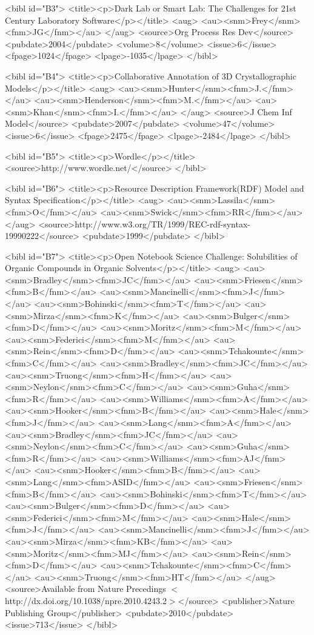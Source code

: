 \documentclass[10pt]{bmc_article}
\newenvironment{bmcformat}{\begin{raggedright}\baselineskip20pt\sloppy\setboolean{publ}{false}}{\end{raggedright}\baselineskip20pt\sloppy}
\begin{document}
\begin{bmcformat}
{<bibl id="B3">
  <title><p>Dark Lab or Smart Lab: The Challenges for 21st Century Laboratory
  Software</p></title>
  <aug>
    <au><snm>Frey</snm><fnm>JG</fnm></au>
  </aug>
  <source>Org Process Res Dev</source>
  <pubdate>2004</pubdate>
  <volume>8</volume>
  <issue>6</issue>
  <fpage>1024</fpage>
  <lpage>-1035</lpage>
</bibl>

<bibl id="B4">
  <title><p>Collaborative Annotation of {3D} Crystallographic
  Models</p></title>
  <aug>
    <au><snm>Hunter</snm><fnm>J.</fnm></au>
    <au><snm>Henderson</snm><fnm>M.</fnm></au>
    <au><snm>Khan</snm><fnm>I.</fnm></au>
  </aug>
  <source>J Chem Inf Model</source>
  <pubdate>2007</pubdate>
  <volume>47</volume>
  <issue>6</issue>
  <fpage>2475</fpage>
  <lpage>-2484</lpage>
</bibl>

<bibl id="B5">
  <title><p>Wordle</p></title>
  <source>http://www.wordle.net/</source>
</bibl>

<bibl id="B6">
  <title><p>Resource Description {Framework(RDF}) Model and Syntax
  Specification</p></title>
  <aug>
    <au><snm>Lassila</snm><fnm>O</fnm></au>
    <au><snm>Swick</snm><fnm>RR</fnm></au>
  </aug>
  <source>http://www.w3.org/TR/1999/REC-rdf-syntax-19990222</source>
  <pubdate>1999</pubdate>
</bibl>

<bibl id="B7">
  <title><p>Open Notebook Science Challenge: Solubilities of Organic Compounds
  in Organic Solvents</p></title>
  <aug>
    <au><snm>Bradley</snm><fnm>JC</fnm></au>
    <au><snm>Friesen</snm><fnm>B</fnm></au>
    <au><snm>Mancinelli</snm><fnm>J</fnm></au>
    <au><snm>Bohinski</snm><fnm>T</fnm></au>
    <au><snm>Mirza</snm><fnm>K</fnm></au>
    <au><snm>Bulger</snm><fnm>D</fnm></au>
    <au><snm>Moritz</snm><fnm>M</fnm></au>
    <au><snm>Federici</snm><fnm>M</fnm></au>
    <au><snm>Rein</snm><fnm>D</fnm></au>
    <au><snm>Tchakounte</snm><fnm>C</fnm></au>
    <au><snm>Bradley</snm><fnm>JC</fnm></au>
    <au><snm>Truong</snm><fnm>H</fnm></au>
    <au><snm>Neylon</snm><fnm>C</fnm></au>
    <au><snm>Guha</snm><fnm>R</fnm></au>
    <au><snm>Williams</snm><fnm>A</fnm></au>
    <au><snm>Hooker</snm><fnm>B</fnm></au>
    <au><snm>Hale</snm><fnm>J</fnm></au>
    <au><snm>Lang</snm><fnm>A</fnm></au>
    <au><snm>Bradley</snm><fnm>JC</fnm></au>
    <au><snm>Neylon</snm><fnm>C</fnm></au>
    <au><snm>Guha</snm><fnm>R</fnm></au>
    <au><snm>Williams</snm><fnm>AJ</fnm></au>
    <au><snm>Hooker</snm><fnm>B</fnm></au>
    <au><snm>Lang</snm><fnm>ASID</fnm></au>
    <au><snm>Friesen</snm><fnm>B</fnm></au>
    <au><snm>Bohinski</snm><fnm>T</fnm></au>
    <au><snm>Bulger</snm><fnm>D</fnm></au>
    <au><snm>Federici</snm><fnm>M</fnm></au>
    <au><snm>Hale</snm><fnm>J</fnm></au>
    <au><snm>Mancinelli</snm><fnm>J</fnm></au>
    <au><snm>Mirza</snm><fnm>KB</fnm></au>
    <au><snm>Moritz</snm><fnm>MJ</fnm></au>
    <au><snm>Rein</snm><fnm>D</fnm></au>
    <au><snm>Tchakounte</snm><fnm>C</fnm></au>
    <au><snm>Truong</snm><fnm>HT</fnm></au>
  </aug>
  <source>Available from Nature Precedings
  $<$http://dx.doi.org/10.1038/npre.2010.4243.2$>$</source>
  <publisher>Nature Publishing Group</publisher>
  <pubdate>2010</pubdate>
  <issue>713</issue>
</bibl>

}
\end{bmcformat}
\end{document}
